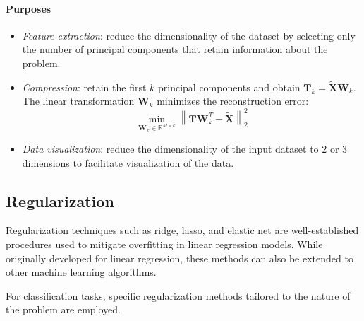 \paragraph*{Purposes}
\begin{itemize}
    \item \textit{Feature extraction}: reduce the dimensionality of the dataset by selecting only the number of principal components that retain information about the problem.
    \item \textit{Compression}: retain the first $k$ principal components and obtain $\mathbf{T}_k = \tilde{\mathbf{X}}\mathbf{W}_k$. 
        The linear transformation $\mathbf{W}_k$ minimizes the reconstruction error:
        \[\min_{\mathbf{W}_k\in\mathbb{R}^{M\times k}}\left\lVert \mathbf{T}\mathbf{W}_k^T-\tilde{\mathbf{X}}\right\rVert _2^2 \]
    \item \textit{Data visualization}: reduce the dimensionality of the input dataset to 2 or 3 dimensions to facilitate visualization of the data.
\end{itemize}

\subsection{Regularization}
Regularization techniques such as ridge, lasso, and elastic net are well-established procedures used to mitigate overfitting in linear regression models. 
While originally developed for linear regression, these methods can also be extended to other machine learning algorithms.

For classification tasks, specific regularization methods tailored to the nature of the problem are employed. 